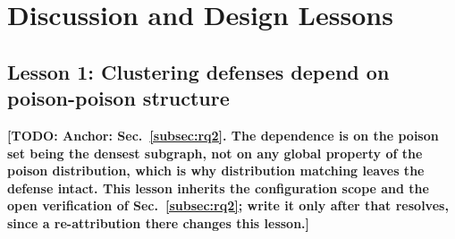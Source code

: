 \documentclass[conference]{IEEEtran}
\newcommand{\TODO}[1]{\textbf{[TODO: #1]}}
\begin{document}
%
%
%

\section{Discussion and Design Lessons}
\label{sec:discussion}

\subsection{Lesson 1: Clustering defenses depend on poison-poison structure}
\TODO{Anchor: Sec.~\ref{subsec:rq2}. The dependence is on the poison set being the
densest subgraph, not on any global property of the poison distribution, which is
why distribution matching leaves the defense intact. This lesson inherits the
configuration scope and the open verification of Sec.~\ref{subsec:rq2}; write it
only after that resolves, since a re-attribution there changes this lesson.}
\end{document}
